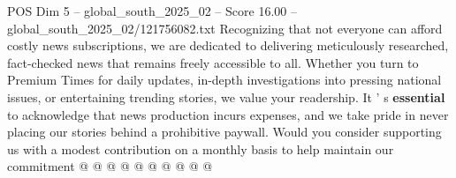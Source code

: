 \begin{textsample}{POS Dim 5 – global\_south\_2025\_02 – Score 16.00 – global\_south\_2025\_02/121756082.txt}
Recognizing that not everyone can afford costly news subscriptions, we are dedicated to delivering meticulously researched, fact-checked news that remains freely accessible to all.
Whether you turn to Premium Times for daily updates, in-depth investigations into pressing national issues, or entertaining trending stories, we value your readership.
It ' s \textbf{essential} to acknowledge that news production incurs expenses, and we take pride in never placing our stories behind a prohibitive paywall.
Would you consider supporting us with a modest contribution on a monthly basis to help maintain our commitment @ @ @ @ @ @ @ @ @ @

\end{textsample}
